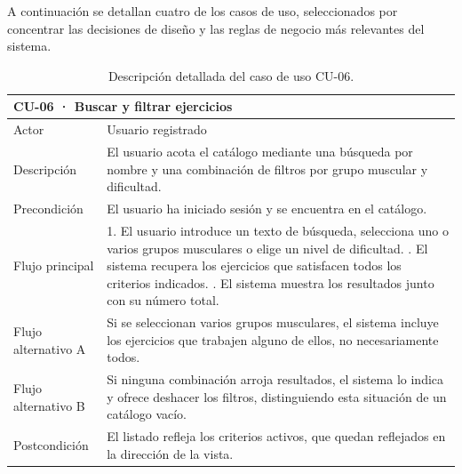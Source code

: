\documentclass[12pt,a4paper,twoside,openright]{book}
\begin{document}
    A continuación se detallan cuatro de los casos de uso, seleccionados por
    concentrar las decisiones de diseño y las reglas de negocio más relevantes
    del sistema.

    \begin{table}[htbp]
        \centering
        \small
        \begin{tabular}{p{2.7cm} p{9.8cm}}
            \toprule
            \multicolumn{2}{l}{\textbf{CU-06 · Buscar y filtrar ejercicios}} \\
            \midrule
            Actor & Usuario registrado \\
            Descripción & El usuario acota el catálogo mediante una búsqueda por nombre y una combinación de filtros por grupo muscular y dificultad. \\
            Precondición & El usuario ha iniciado sesión y se encuentra en el catálogo. \\
            Flujo principal & 1. El usuario introduce un texto de búsqueda, selecciona uno o varios grupos musculares o elige un nivel de dificultad. \newline
                              2. El sistema recupera los ejercicios que satisfacen todos los criterios indicados. \newline
                              3. El sistema muestra los resultados junto con su número total. \\
            Flujo alternativo A & Si se seleccionan varios grupos musculares, el sistema incluye los ejercicios que trabajen alguno de ellos, no necesariamente todos. \\
            Flujo alternativo B & Si ninguna combinación arroja resultados, el sistema lo indica y ofrece deshacer los filtros, distinguiendo esta situación de un catálogo vacío. \\
            Postcondición & El listado refleja los criterios activos, que quedan reflejados en la dirección de la vista. \\
            \bottomrule
        \end{tabular}
        \caption{Descripción detallada del caso de uso CU-06.}
        \label{tab:cu-06}
    \end{table}
\end{document}
